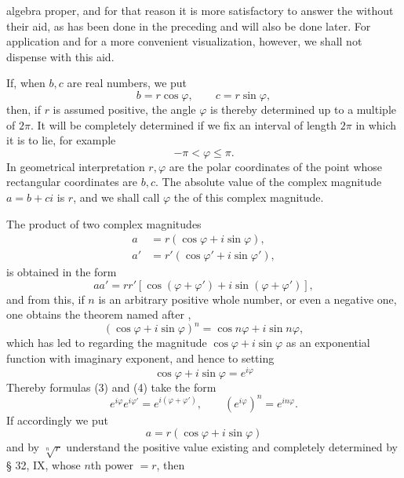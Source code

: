 
algebra proper, and for that reason it is more satisfactory to answer the  without their aid, as has been done in the preceding and will also be done later. For application and for a more convenient visualization, however, we shall not dispense with this aid.

If, when $b,c$ are real numbers, we put
\begin{equation}
 b=r\cos\varphi,
\qquad c=r\sin\varphi,
\tag{1}
\end{equation}
then, if $r$ is assumed positive, the angle $\varphi$ is thereby determined up to a multiple of $2\pi$. It will be completely determined if we fix an interval of length $2\pi$ in which it is to lie, for example
\[
 -\pi<\varphi\le \pi.
\]
In geometrical interpretation $r,\varphi$ are the polar coordinates of the point whose rectangular coordinates are $b,c$. The absolute value of the complex magnitude $a=b+ci$ is $r$, and we shall call $\varphi$ the  of this complex magnitude.

The product of two complex magnitudes
\begin{equation}
\begin{aligned}
 a&=r(\cos\varphi+i\sin\varphi),\\
 a'&=r'(\cos\varphi'+i\sin\varphi'),
\end{aligned}
\tag{2}
\end{equation}
is obtained in the form
\begin{equation}
 aa'=rr'[\cos(\varphi+\varphi')+i\sin(\varphi+\varphi')],
\tag{3}
\end{equation}
and from this, if $n$ is an arbitrary positive whole number, or even a negative one, one obtains the theorem named after ,
\begin{equation}
 (\cos\varphi+i\sin\varphi)^n=\cos n\varphi+i\sin n\varphi,
\tag{4}
\end{equation}
which has led to regarding the magnitude $\cos\varphi+i\sin\varphi$ as an exponential function with imaginary exponent, and hence to setting
\[
 \cos\varphi+i\sin\varphi=e^{i\varphi}
\]
Thereby formulas (3) and (4) take the form
\begin{equation}
 e^{i\varphi}e^{i\varphi'}=e^{i(\varphi+\varphi')},\qquad (e^{i\varphi})^n=e^{in\varphi}.
\tag{5}
\end{equation}
If accordingly we put
\begin{equation}
 a=r(\cos\varphi+i\sin\varphi)
\tag{6}
\end{equation}
and by $\sqrt[n]{r}$ understand the positive value existing and completely determined by § 32, IX, whose $n$th power $=r$, then
